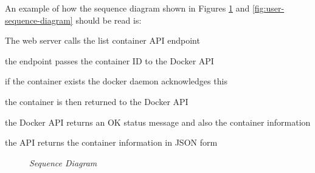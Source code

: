An example of how the sequence diagram shown in Figures \ref{fig:sequence-diagram} and \ref{fig:user-sequence-diagram} should be read is:
\begin{legal}
	\item The web server calls the list container API endpoint
	\begin{legal} 
		\item the endpoint passes the container ID to the Docker API 
	\begin{legal} 
		\item if the container exists the docker daemon acknowledges this 
		\item the container is then returned to the Docker API 
	\end{legal}
	\item the Docker API returns an OK status message and also the container information 
	\item the API returns the container information in JSON form 
	\end{legal}
\end{legal}

\begin{figure}[!ht]
\centering
{}
\caption{\em Sequence Diagram}
\label{fig:sequence-diagram}
\end{figure}
\clearpage

